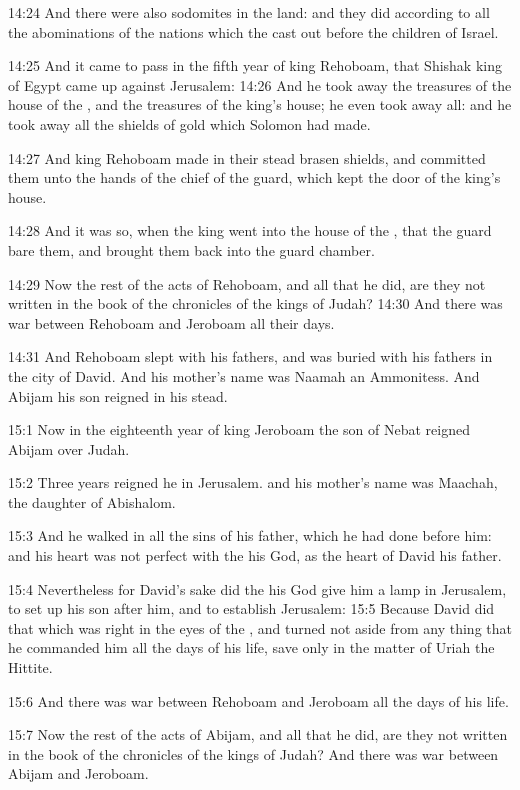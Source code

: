 14:24 And there were also sodomites in the land: and they did according to all the abominations of the nations which the \LORD cast out before the children of Israel.

14:25 And it came to pass in the fifth year of king Rehoboam, that Shishak king of Egypt came up against Jerusalem: 14:26 And he took away the treasures of the house of the \LORD, and the treasures of the king's house; he even took away all: and he took away all the shields of gold which Solomon had made.

14:27 And king Rehoboam made in their stead brasen shields, and committed them unto the hands of the chief of the guard, which kept the door of the king's house.

14:28 And it was so, when the king went into the house of the \LORD, that the guard bare them, and brought them back into the guard chamber.

14:29 Now the rest of the acts of Rehoboam, and all that he did, are they not written in the book of the chronicles of the kings of Judah?  14:30 And there was war between Rehoboam and Jeroboam all their days.

14:31 And Rehoboam slept with his fathers, and was buried with his fathers in the city of David. And his mother's name was Naamah an Ammonitess. And Abijam his son reigned in his stead.

15:1 Now in the eighteenth year of king Jeroboam the son of Nebat reigned Abijam over Judah.

15:2 Three years reigned he in Jerusalem. and his mother's name was Maachah, the daughter of Abishalom.

15:3 And he walked in all the sins of his father, which he had done before him: and his heart was not perfect with the \LORD his God, as the heart of David his father.

15:4 Nevertheless for David's sake did the \LORD his God give him a lamp in Jerusalem, to set up his son after him, and to establish Jerusalem: 15:5 Because David did that which was right in the eyes of the \LORD, and turned not aside from any thing that he commanded him all the days of his life, save only in the matter of Uriah the Hittite.

15:6 And there was war between Rehoboam and Jeroboam all the days of his life.

15:7 Now the rest of the acts of Abijam, and all that he did, are they not written in the book of the chronicles of the kings of Judah? And there was war between Abijam and Jeroboam.

